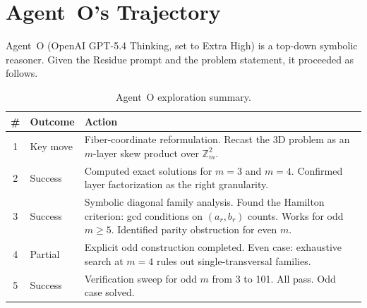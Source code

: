 \documentclass[11pt]{article}
\theoremstyle{definition}
\theoremstyle{remark}
\newcommand{\Zm}{\mathbb{Z}_m}
\begin{document}
\section{Agent~O's Trajectory}
\label{sec:fast}

Agent~O (OpenAI GPT-5.4 Thinking, set to Extra High) is a top-down symbolic reasoner. Given the Residue prompt and the problem statement, it proceeded as follows.

\begin{table}[h]
\centering
\caption{Agent~O exploration summary.}
\label{tab:fast}
\begin{tabular}{@{}clp{8cm}@{}}
\toprule
\# & Outcome & Action \\
\midrule
1 & Key move & Fiber-coordinate reformulation. Recast the 3D problem as an $m$-layer skew product over $\Zm^2$. \\
2 & Success & Computed exact solutions for $m = 3$ and $m = 4$. Confirmed layer factorization as the right granularity. \\
3 & Success & Symbolic diagonal family analysis. Found the Hamilton criterion: gcd conditions on $(a_r, b_r)$ counts. Works for odd $m \geq 5$. Identified parity obstruction for even $m$. \\
4 & Partial & Explicit odd construction completed. Even case: exhaustive search at $m = 4$ rules out single-transversal families. \\
5 & Success & Verification sweep for odd $m$ from 3 to 101. All pass. Odd case solved. \\
\bottomrule
\end{tabular}
\end{table}
\end{document}

